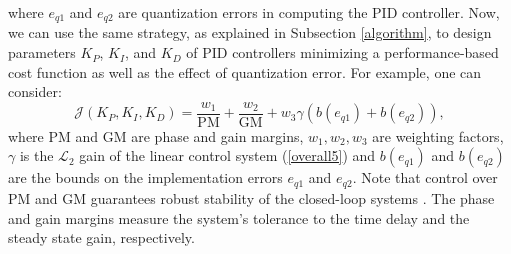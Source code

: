 \documentclass{amsart}
\numberwithin{equation}{section}
\begin{document}
where $e_{q1}$ and $e_{q2}$ are quantization errors in computing the PID controller. Now, we can use the same strategy, as explained in Subsection \ref{algorithm}, to design parameters $K_P$, $K_I$, and $K_D$ of PID controllers minimizing a performance-based cost function as well as the effect of quantization error. For example, one can consider:
\begin{equation}\label{cost2}
\mathcal{J}(K_P,K_I,K_D) = \frac{w_1}{\text{PM}}+\frac{w_2}{\text{GM}}+w_3\gamma(b(e_{q1})+b(e_{q2})),
\end{equation}
where PM and GM are phase and gain margins, $w_1,w_2,w_3$ are weighting factors, $\gamma$ is the $\mathcal{L}_2$ gain of the linear control system (\ref{overall5}) and $b(e_{q1})$ and $b(e_{q2})$ are the bounds on the implementation errors $e_{q1}$ and $e_{q2}$. Note that control over PM and GM guarantees robust stability of the closed-loop systems \cite{joao}. The phase and gain margins measure the system's tolerance to the time delay and the steady state gain, respectively.

\begin{small}
\begin{table*}[t]
 \centering
\caption{Synthesized gains and required time for synthesizing them.}
\label{table-exp1}
\end{table*}
\end{small}
\end{document}
